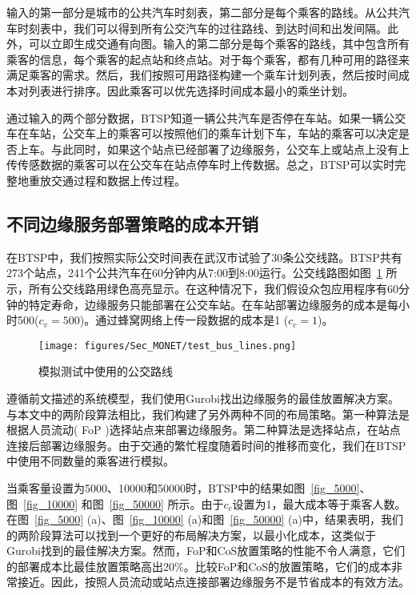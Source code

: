 输入的第一部分是城市的公共汽车时刻表，第二部分是每个乘客的路线。从公共汽车时刻表中，我们可以得到所有公交汽车的过往路线、到达时间和出发间隔。此外，可以立即生成交通有向图。输入的第二部分是每个乘客的路线，其中包含所有乘客的信息，每个乘客的起点站和终点站。对于每个乘客，都有几种可用的路径来满足乘客的需求。然后，我们按照可用路径构建一个乘车计划列表，然后按时间成本对列表进行排序。因此乘客可以优先选择时间成本最小的乘坐计划。

通过输入的两个部分数据，BTSP知道一辆公共汽车是否停在车站。如果一辆公交车在车站，公交车上的乘客可以按照他们的乘车计划下车，车站的乘客可以决定是否上车。与此同时，如果这个站点已经部署了边缘服务，公交车上或站点上没有上传传感数据的乘客可以在公交车在站点停车时上传数据。总之，BTSP可以实时完整地重放交通过程和数据上传过程。

\subsection{不同边缘服务部署策略的成本开销}

在BTSP中，我们按照实际公交时间表在武汉市试验了30条公交线路。BTSP共有273个站点，241个公共汽车在60分钟内从7:00到8:00运行。公交线路图如图~\ref{Figure_test_bus_lines} 所示，所有公交线路用绿色高亮显示。在这种情况下，我们假设众包应用程序有60分钟的特定寿命，边缘服务只能部署在公交车站。在车站部署边缘服务的成本是每小时500($c_v = 500$)。通过蜂窝网络上传一段数据的成本是1 ($c_c = 1$)。

\begin{figure}[!h]
  \centering
  \texttt{[image: figures/Sec\_MONET/test\_bus\_lines.png]}
  \vspace{-0.5em}
  \caption{模拟测试中使用的公交路线}
  \label{Figure_test_bus_lines}
\end{figure}

遵循前文描述的系统模型，我们使用Gurobi找出边缘服务的最佳放置解决方案。与本文中的两阶段算法相比，我们构建了另外两种不同的布局策略。第一种算法是根据人员流动( FoP )选择站点来部署边缘服务。第二种算法是选择站点，在站点连接后部署边缘服务。由于交通的繁忙程度随着时间的推移而变化，我们在BTSP中使用不同数量的乘客进行模拟。

当乘客量设置为5000、10000和50000时，BTSP中的结果如图~\ref{fig_5000}、图~\ref{fig_10000} 和图~\ref{fig_50000} 所示。由于$c_c$设置为1，最大成本等于乘客人数。在图~\ref{fig_5000} (a)、图~\ref{fig_10000} (a)和图~\ref{fig_50000} (a)中，结果表明，我们的两阶段算法可以找到一个更好的布局解决方案，以最小化成本，这类似于Gurobi找到的最佳解决方案。然而，FoP和CoS放置策略的性能不令人满意，它们的部署成本比最佳放置策略高出20\%。比较FoP和CoS的放置策略，它们的成本非常接近。因此，按照人员流动或站点连接部署边缘服务不是节省成本的有效方法。

